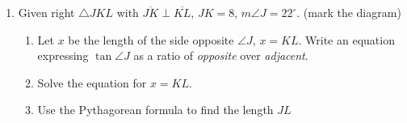 \documentclass[12pt, twoside]{article}
\begin{document}
\begin{enumerate}
  \item Given right $\triangle JKL$ with $\overline{JK} \perp \overline{KL}$, $JK=8$, $m\angle J=22^\circ$. (mark the diagram)
      \begin{enumerate}
        \item Let $x$ be the length of the side opposite $\angle J$, $x=KL$. Write an equation expressing $\tan \angle J$ as a ratio of \emph{opposite} over \emph{adjacent}.  
      \begin{flushright}
        \end{flushright}
        \item Solve the equation for $x=KL$. \vspace{3cm}
        \item Use the Pythagorean formula to find the length $JL$
      \end{enumerate}

\end{enumerate}
\end{document}
